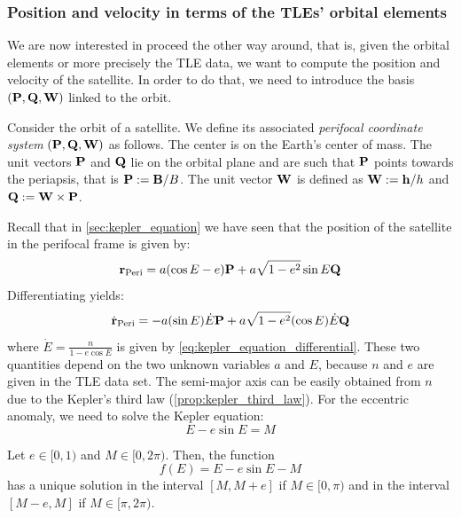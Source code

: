 \documentclass[../main.tex]{subfiles}
\begin{document}
\subsubsection{Position and velocity in terms of the TLEs' orbital elements}
We are now interested in proceed the other way around, that is, given the orbital elements or more precisely the TLE data, we want to compute the position and velocity of the satellite. In order to do that, we need to introduce the basis $(\boldsymbol{\mathrm{P}}, \boldsymbol{\mathrm{Q}}, \boldsymbol{\mathrm{W}})$ linked to the orbit.
\begin{definition}\label{def:perifocal_coordinate_system}
  Consider the orbit of a satellite. We define its associated \emph{perifocal coordinate system} $ (\boldsymbol{\mathrm{P}}, \boldsymbol{\mathrm{Q}}, \boldsymbol{\mathrm{W}}) $ as follows. The center is on the Earth's center of mass. The unit vectors $\boldsymbol{\mathrm{P}}$ and $\boldsymbol{\mathrm{Q}}$ lie on the orbital plane and are such that $\boldsymbol{\mathrm{P}}$ points towards the periapsis, that is $\boldsymbol{\mathrm{P}}:=\boldsymbol{\mathrm{B}}/B$. The unit vector $\boldsymbol{\mathrm{W}}$ is defined as $\boldsymbol{\mathrm{W}}:=\boldsymbol{\mathrm{h}}/h$ and $\boldsymbol{\mathrm{Q}}:=\boldsymbol{\mathrm{W}}\times\boldsymbol{\mathrm{P}}$.
\end{definition}
Recall that in \cref{sec:kepler_equation} we have seen that the position of the satellite in the perifocal frame is given by:
\begin{equation}
  \boldsymbol{\mathrm{r}}_\mathrm{Peri} = a(\cos E-e)\boldsymbol{\mathrm{P}} + a\sqrt{1-e^2}\sin E\boldsymbol{\mathrm{Q}}
\end{equation}
Differentiating yields:
\begin{equation}
  \dot{\boldsymbol{\mathrm{r}}}_\mathrm{Peri} = - a (\sin E)\dot{E}\boldsymbol{\mathrm{P}}+a\sqrt{1-e^2}(\cos E)\dot{E}\boldsymbol{\mathrm{Q}}
\end{equation}
where $\dot{E}=\frac{n}{1-e\cos E}$ is given by \cref{eq:kepler_equation_differential}. These two quantities depend on the two unknown variables $a$ and $E$, because $n$ and $e$ are given in the TLE data set. The semi-major axis can be easily obtained from $n$ due to the Kepler's third law (\cref{prop:kepler_third_law}). For the eccentric anomaly, we need to solve the Kepler equation:
\begin{equation}
  E-e\sin E = M
\end{equation}
\begin{lemma}
  Let $e\in[0,1)$ and $M\in[0,2\pi)$. Then, the function
  \begin{equation}
    f(E) = E-e\sin E - M
  \end{equation}
  has a unique solution in the interval $[M, M+e]$ if $M\in[0,\pi)$ and in the interval $[M-e, M]$ if $M\in[\pi,2\pi)$.
\end{lemma}
\end{document}
